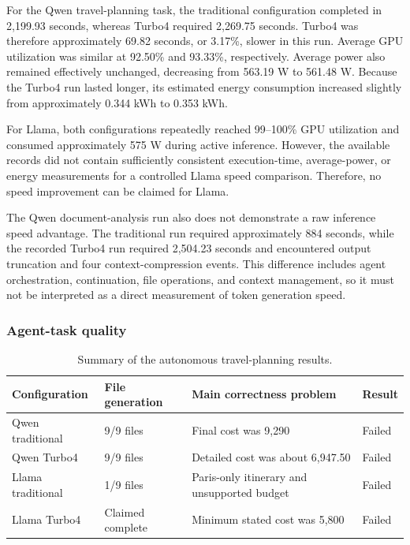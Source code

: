 For the Qwen travel-planning task, the traditional configuration completed
in 2,199.93 seconds, whereas Turbo4 required 2,269.75 seconds. Turbo4 was
therefore approximately 69.82 seconds, or 3.17\%, slower in this run.
Average GPU utilization was similar at 92.50\% and 93.33\%, respectively.
Average power also remained effectively unchanged, decreasing from
563.19 W to 561.48 W. Because the Turbo4 run lasted longer, its estimated
energy consumption increased slightly from approximately 0.344 kWh to
0.353 kWh.

For Llama, both configurations repeatedly reached 99--100\% GPU utilization
and consumed approximately 575 W during active inference. However, the
available records did not contain sufficiently consistent execution-time,
average-power, or energy measurements for a controlled Llama speed
comparison. Therefore, no speed improvement can be claimed for Llama.

The Qwen document-analysis run also does not demonstrate a raw inference
speed advantage. The traditional run required approximately 884 seconds,
while the recorded Turbo4 run required 2,504.23 seconds and encountered
output truncation and four context-compression events. This difference
includes agent orchestration, continuation, file operations, and context
management, so it must not be interpreted as a direct measurement of token
generation speed.

\subsubsection{Agent-task quality}

\begin{table}[t]
\centering
\small
\caption{Summary of the autonomous travel-planning results.}
\label{tab:combined-agent-quality}
\begin{tabular}{llll}
\toprule
Configuration & File generation & Main correctness problem & Result \\
\midrule
Qwen traditional & 9/9 files & Final cost was \texteuro{}9,290 & Failed \\
Qwen Turbo4 & 9/9 files & Detailed cost was about \texteuro{}6,947.50 & Failed \\
Llama traditional & 1/9 files & Paris-only itinerary and unsupported budget & Failed \\
Llama Turbo4 & Claimed complete & Minimum stated cost was \texteuro{}5,800 & Failed \\
\bottomrule
\end{tabular}
\end{table}

